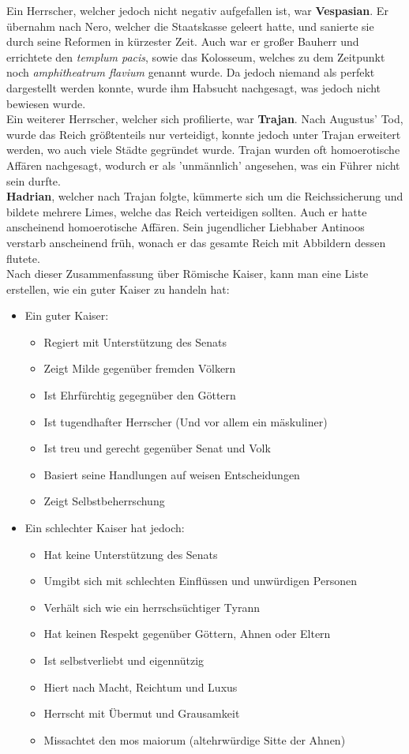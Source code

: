 \documentclass{article}
\begin{document}
	Ein Herrscher, welcher jedoch nicht negativ aufgefallen ist, war \textbf{Vespasian}. Er übernahm nach Nero, welcher die Staatskasse geleert hatte, und sanierte sie durch seine Reformen in kürzester Zeit. Auch war er großer Bauherr und errichtete den \textit{templum pacis}, sowie das Kolosseum, welches zu dem Zeitpunkt noch \textit{amphitheatrum flavium} genannt wurde. Da jedoch niemand als perfekt dargestellt werden konnte, wurde ihm Habsucht nachgesagt, was jedoch nicht bewiesen wurde. \\
	Ein weiterer Herrscher, welcher sich profilierte, war \textbf{Trajan}. Nach Augustus' Tod, wurde das Reich größtenteils nur verteidigt, konnte jedoch unter Trajan erweitert werden, wo auch viele Städte gegründet wurde. Trajan wurden oft homoerotische Affären nachgesagt, wodurch er als 'unmännlich' angesehen, was ein Führer nicht sein durfte. \\
	\textbf{Hadrian}, welcher nach Trajan folgte, kümmerte sich um die Reichssicherung und bildete mehrere Limes, welche das Reich verteidigen sollten. Auch er hatte anscheinend homoerotische Affären. Sein jugendlicher Liebhaber Antinoos verstarb anscheinend früh, wonach er das gesamte Reich mit Abbildern dessen flutete. \\
	\newpage
	Nach dieser Zusammenfassung über Römische Kaiser, kann man eine Liste erstellen, wie ein guter Kaiser zu handeln hat:
	\begin{itemize}
		\item{Ein guter Kaiser:}
		\begin{itemize}
			\item{Regiert mit Unterstützung des Senats}
			\item{Zeigt Milde gegenüber fremden Völkern}
			\item{Ist Ehrfürchtig gegegnüber den Göttern}
			\item{Ist tugendhafter Herrscher (Und vor allem ein mäskuliner)}
			\item{Ist treu und gerecht gegenüber Senat und Volk}
			\item{Basiert seine Handlungen auf weisen Entscheidungen}
			\item{Zeigt Selbstbeherrschung}
		\end{itemize}
		\item{Ein schlechter Kaiser hat jedoch:}
		\begin{itemize}
			\item{Hat keine Unterstützung des Senats}
			\item{Umgibt sich mit schlechten Einflüssen und unwürdigen Personen}
			\item{Verhält sich wie ein herrschsüchtiger Tyrann}
			\item{Hat keinen Respekt gegenüber Göttern, Ahnen oder Eltern}
			\item{Ist selbstverliebt und eigennützig}
			\item{Hiert nach Macht, Reichtum und Luxus}
			\item{Herrscht mit Übermut und Grausamkeit}
			\item{Missachtet den mos maiorum (altehrwürdige Sitte der Ahnen)}
		\end{itemize}
	\end{itemize}
\end{document}

